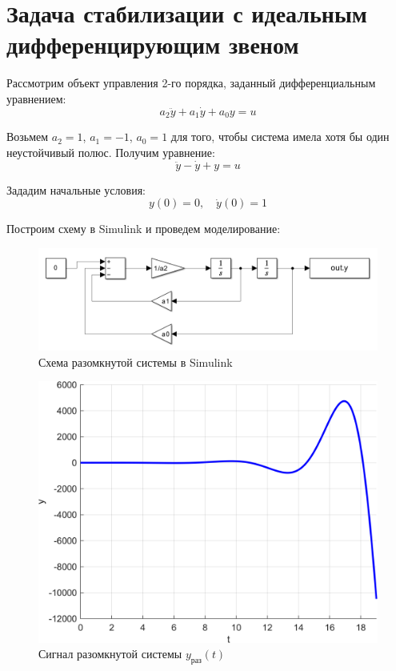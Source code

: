 \chapter{Задача стабилизации с идеальным дифференцирующим звеном}
Рассмотрим объект управления 2-го порядка, заданный дифференциальным 
уравнением:
\[
a_2\ddot{y} + a_1\dot{y} + a_0y = u
\]

Возьмем $a_2 = 1$, $a_1 = -1$, $a_0 = 1$ для того, чтобы система имела хотя
бы один неустойчивый полюс. Получим уравнение:
\[
\ddot{y} - \dot{y} + y = u
\]

Зададим начальные условия:
\[
y(0) = 0, \quad \dot{y}(0) = 1
\]

Построим схему в Simulink и проведем моделирование:
\begin{figure}[H]
    \centering
    \includegraphics[width=1\textwidth, trim={0cm 0cm 0cm 0cm}]{../images/sim1.png}
    \caption{Схема разомкнутой системы в Simulink} 
\end{figure}
\begin{figure}[H]
    \centering
    \includegraphics[width=1\textwidth, trim={0cm 0cm 0cm 0cm}]{../images/1_1.png}
    \caption{Сигнал разомкнутой системы $y_{\text{раз}}(t)$} 
\end{figure}


